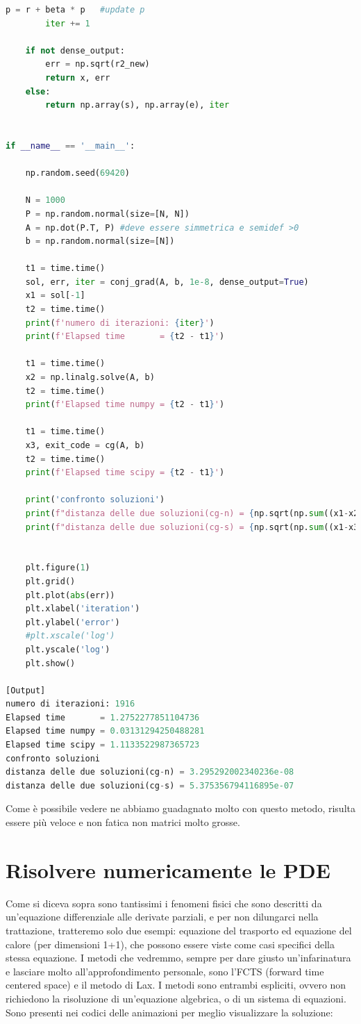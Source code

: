 \documentclass[10pt,a4paper]{article}
\begin{document}
\begin{lstlisting}[language=Python]
        p = r + beta * p   #update p
        iter += 1

    if not dense_output:
        err = np.sqrt(r2_new)
        return x, err
    else:
        return np.array(s), np.array(e), iter


if __name__ == '__main__':

    np.random.seed(69420)

    N = 1000
    P = np.random.normal(size=[N, N])
    A = np.dot(P.T, P) #deve essere simmetrica e semidef >0
    b = np.random.normal(size=[N])

    t1 = time.time()
    sol, err, iter = conj_grad(A, b, 1e-8, dense_output=True)
    x1 = sol[-1]
    t2 = time.time()
    print(f'numero di iterazioni: {iter}')
    print(f'Elapsed time       = {t2 - t1}')

    t1 = time.time()
    x2 = np.linalg.solve(A, b)
    t2 = time.time()
    print(f'Elapsed time numpy = {t2 - t1}')

    t1 = time.time()
    x3, exit_code = cg(A, b)
    t2 = time.time()
    print(f'Elapsed time scipy = {t2 - t1}')

    print('confronto soluzioni')
    print(f"distanza delle due soluzioni(cg-n) = {np.sqrt(np.sum((x1-x2)**2))}")
    print(f"distanza delle due soluzioni(cg-s) = {np.sqrt(np.sum((x1-x3)**2))}")


    plt.figure(1)
    plt.grid()
    plt.plot(abs(err))
    plt.xlabel('iteration')
    plt.ylabel('error')
    #plt.xscale('log')
    plt.yscale('log')
    plt.show()

[Output]
numero di iterazioni: 1916
Elapsed time       = 1.2752277851104736
Elapsed time numpy = 0.03131294250488281
Elapsed time scipy = 1.1133522987365723
confronto soluzioni
distanza delle due soluzioni(cg-n) = 3.295292002340236e-08
distanza delle due soluzioni(cg-s) = 5.375356794116895e-07
\end{lstlisting}
Come è possibile vedere ne abbiamo guadagnato molto con questo metodo, risulta essere più veloce e non fatica non matrici molto grosse.





\newpage


\section{Risolvere numericamente le PDE}
Come si diceva sopra sono tantissimi i fenomeni fisici che sono descritti da un'equazione differenziale alle derivate parziali, e per non dilungarci nella trattazione, tratteremo solo due esempi: equazione del trasporto ed equazione del calore (per dimensioni 1+1), che possono essere viste come casi specifici della stessa equazione. I metodi che vedremmo, sempre per dare giusto un'infarinatura e lasciare molto all'approfondimento personale, sono l'FCTS (forward time centered space) e il metodo di Lax. I metodi sono entrambi espliciti, ovvero non richiedono la risoluzione di un'equazione algebrica, o di un sistema di equazioni. Sono presenti nei codici delle animazioni per meglio visualizzare la soluzione:
\end{document}

